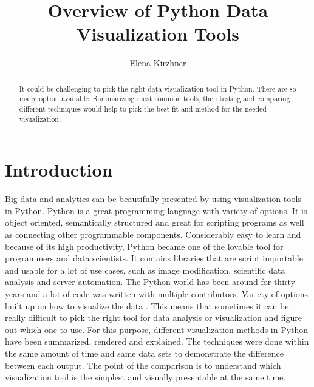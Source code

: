 \documentclass[sigconf]{acmart}
\begin{document}
\title{Overview of Python Data Visualization Tools}


\author{Elena Kirzhner}


\begin{abstract}
It could be challenging to pick the right data visualization tool in Python. There are so many option available. Summarizing most common tools, then testing and comparing different techniques would help to pick the best fit and method for the needed visualization.
\end{abstract}


\maketitle

\section{Introduction}

Big data and analytics can be beautifully presented by using visualization tools in Python. Python is a great programming language with variety of options. It is object oriented, semantically structured and great for scripting programs as well as connecting other programmable components. Considerably easy to learn and because of its high productivity, Python became one of the lovable tool for programmers and data scientists. It contains libraries that are script importable and usable for a lot of use cases, such as image modification, scientific data analysis and server automation. The Python world has been around for thirty years and a lot of code was written with multiple contributors. Variety of options built up on how to visualize the data \cite{van2011python}. This means that sometimes it can be really difficult to pick the right tool for data analysis or visualization and figure out which one to use. For this purpose, different visualization methods in Python have been summarized, rendered and explained. The techniques were done within the same amount of time and same data sets to demonstrate the difference between each output. The point of the comparison is to understand which visualization tool is the simplest and visually presentable at the same time. 
\end{document}

